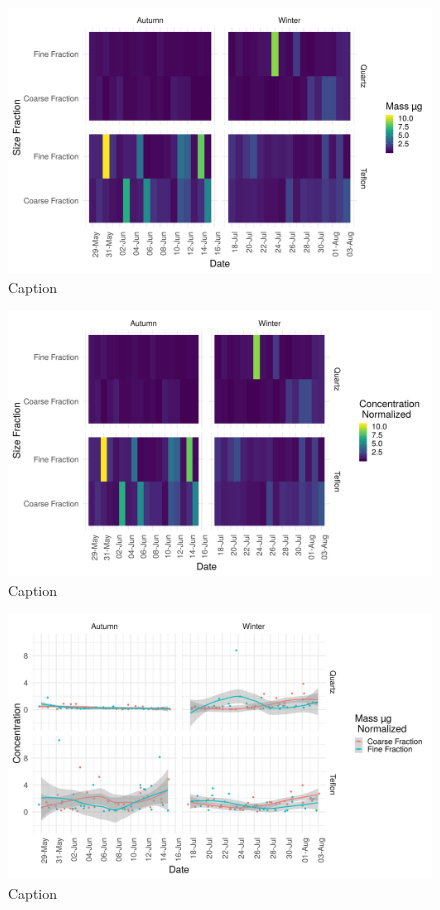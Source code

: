 \documentclass{nwureport}
\begin{document}
\begin{figure}[!htb]
    \centering
    \includegraphics[width=\textwidth]{images/Density_FilterDateSizeSeason_mass.png}
    \caption{Caption}
    \label{fig:summary}
\end{figure}

\begin{figure}[!htb]
    \centering
    \includegraphics[width=\textwidth]{images/Density_FilterDateSizeSeason.png}
    \caption{Caption}
    \label{fig:summary}
\end{figure}

\begin{figure}[!htb]
    \centering
    \includegraphics[width=\textwidth]{images/TS_FilterDateSizeSeason_sep_mass.png}
    \caption{Caption}
    \label{fig:summary}
\end{figure}
\end{document}
